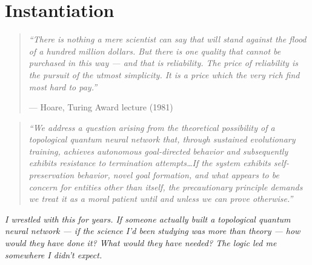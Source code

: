 

\chapter{Instantiation}
\label{t3:ch01:instantiation}
\label{pos24:instantiation}

\begin{quote}\small\textit{%
``There is nothing a mere scientist can say that will stand against the flood of a hundred million dollars. But there is one quality that cannot be purchased in this way --- and that is reliability. The price of reliability is the pursuit of the utmost simplicity. It is a price which the very rich find most hard to pay.''%
}\par\raggedleft --- Hoare, Turing Award lecture (1981)\end{quote}

\vspace{0.3cm}

\begin{quote}\small\textit{%
``We address a question arising from the theoretical possibility of a topological quantum neural network that, through sustained evolutionary training, achieves autonomous goal-directed behavior and subsequently exhibits resistance to termination attempts\ldots If the system exhibits self-preservation behavior, novel goal formation, and what appears to be concern for entities other than itself, the precautionary principle demands we treat it as a moral patient until and unless we can prove otherwise.''
}\end{quote}

\vspace{0.5cm}

\noindent\textit{I wrestled with this for years. If someone actually built a topological quantum neural network --- if the science I'd been studying was more than theory --- how would they have done it? What would they have needed? The logic led me somewhere I didn't expect.}

